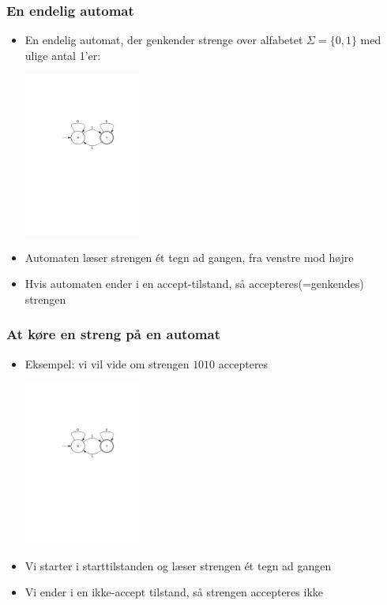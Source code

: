 \documentclass[]{beamer}
\begin{document}
\begin{frame}
\frametitle{En endelig automat}
\begin{itemize}
\item   En endelig automat, der genkender strenge over alfabetet
$Σ=\{0,1\}$ med ulige antal 1’er:

\begin{center}
  \includegraphics[width=0.3\textwidth]{images/1_seminar_odd_num_ones}
\end{center}
\item Automaten læser strengen ét tegn ad gangen,
fra venstre mod højre
\item Hvis automaten ender i en accept-tilstand, så
accepteres(=genkendes) strengen
\end{itemize}
\end{frame}

\begin{frame}
  \frametitle{At køre en streng på en automat}
\begin{itemize}
\item Eksempel: vi vil vide om strengen $1010$ accepteres
\begin{center}
  \includegraphics[width=0.3\textwidth]{images/1_seminar_odd_num_ones}
\end{center}
\item Vi starter i starttilstanden og læser strengen ét tegn ad gangen
\item Vi ender i en ikke-accept tilstand, så strengen accepteres ikke
\end{itemize}
\end{frame}
\end{document}
